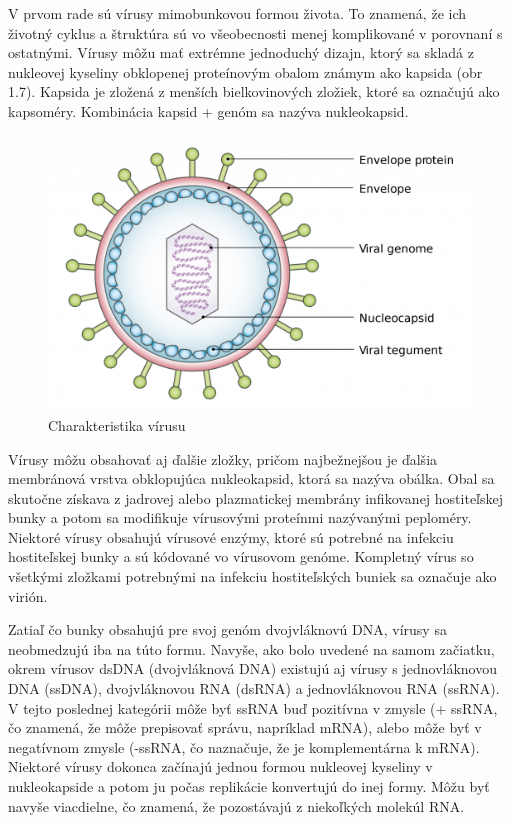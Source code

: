 V prvom rade sú vírusy mimobunkovou formou života. To znamená, že ich životný cyklus a štruktúra sú vo všeobecnosti menej komplikované v porovnaní s ostatnými.
Vírusy môžu mať extrémne jednoduchý dizajn, ktorý sa skladá z nukleovej kyseliny obklopenej proteínovým obalom známym ako kapsida (obr 1.7).
Kapsida je zložená z menších bielkovinových zložiek, ktoré sa označujú ako kapsoméry. Kombinácia kapsid + genóm sa nazýva nukleokapsid.

\begin{figure}[!ht]
	\centering
	\includegraphics[width=.75\textwidth]{figures/virus.png}
	\caption{Charakteristika vírusu \label{o:latex_friendly_zone}}
\end{figure}

Vírusy môžu obsahovať aj ďalšie zložky, pričom najbežnejšou je ďalšia membránová vrstva obklopujúca nukleokapsid, ktorá sa nazýva obálka.
Obal sa skutočne získava z jadrovej alebo plazmatickej membrány infikovanej hostiteľskej bunky a potom sa modifikuje vírusovými proteínmi nazývanými peploméry.
Niektoré vírusy obsahujú vírusové enzýmy, ktoré sú potrebné na infekciu hostiteľskej bunky a sú kódované vo vírusovom genóme.
Kompletný vírus so všetkými zložkami potrebnými na infekciu hostiteľských buniek sa označuje ako virión.

Zatiaľ čo bunky obsahujú pre svoj genóm dvojvláknovú DNA, vírusy sa neobmedzujú iba na túto formu.
Navyše, ako bolo uvedené na samom začiatku, okrem vírusov dsDNA (dvojvláknová DNA) existujú aj vírusy s jednovláknovou DNA (ssDNA), dvojvláknovou RNA (dsRNA) a jednovláknovou RNA (ssRNA).
V tejto poslednej kategórii môže byť ssRNA buď pozitívna v zmysle (+ ssRNA, čo znamená, že môže prepisovať správu, napríklad mRNA), alebo môže byť v negatívnom zmysle (-ssRNA, čo naznačuje, že je komplementárna k mRNA). Niektoré vírusy dokonca začínajú jednou formou nukleovej kyseliny v nukleokapside a potom ju počas replikácie konvertujú do inej formy.
Môžu byť navyše viacdielne, čo znamená, že pozostávajú z niekoľkých molekúl RNA.

